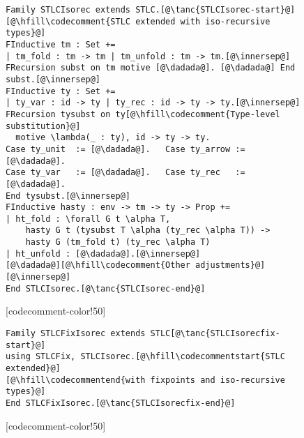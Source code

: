 \begin{figure}
\vspace{-2pt}

\newcommand{\innersep}{\vspace{5pt}}

\begin{minipage}{\textwidth}
\begin{multicols}{2}


\begin{lstlisting}
Family STLCIsorec extends STLC.[@\tanc{STLCIsorec-start}@]
[@\hfill\codecomment{STLC extended with iso-recursive types}@]
FInductive tm : Set +=
| tm_fold : tm -> tm | tm_unfold : tm -> tm.[@\innersep@]
FRecursion subst on tm motive [@\dadada@]. [@\dadada@] End subst.[@\innersep@]
FInductive ty : Set +=
| ty_var : id -> ty | ty_rec : id -> ty -> ty.[@\innersep@]
FRecursion tysubst on ty[@\hfill\codecomment{Type-level substitution}@]
  motive \lambda(_ : ty), id -> ty -> ty.
Case ty_unit  := [@\dadada@].   Case ty_arrow := [@\dadada@].
Case ty_var   := [@\dadada@].   Case ty_rec   := [@\dadada@].
End tysubst.[@\innersep@]
FInductive hasty : env -> tm -> ty -> Prop +=
| ht_fold : \forall G t \alpha T,
    hasty G t (tysubst T \alpha (ty_rec \alpha T)) ->
    hasty G (tm_fold t) (ty_rec \alpha T)
| ht_unfold : [@\dadada@].[@\innersep@]
[@\dadada@][@\hfill\codecomment{Other adjustments}@][@\innersep@]
End STLCIsorec.[@\tanc{STLCIsorec-end}@]
\end{lstlisting}

[codecomment-color!50]

\vspace{-13pt}


\begin{lstlisting}
Family STLCFixIsorec extends STLC[@\tanc{STLCIsorecfix-start}@]
using STLCFix, STLCIsorec.[@\hfill\codecommentstart{STLC extended}@]
[@\hfill\codecommentend{with fixpoints and iso-recursive types}@]
End STLCFixIsorec.[@\tanc{STLCIsorecfix-end}@]
\end{lstlisting}

[codecomment-color!50]

\columnbreak



\end{multicols}
\end{minipage}
\end{figure}

